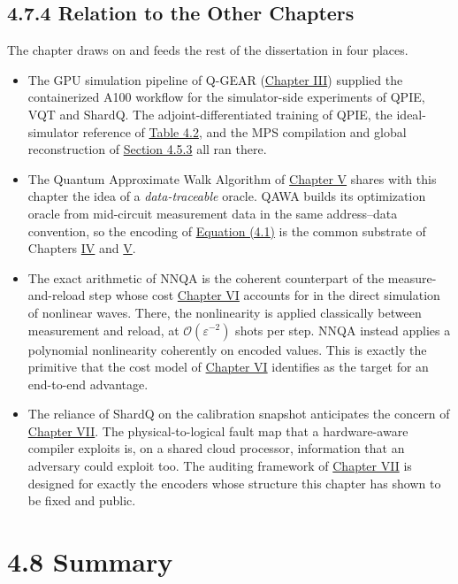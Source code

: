 \documentclass{report}
\theoremstyle{plain}
\theoremstyle{definition}
\theoremstyle{remark}
\newcommand{\bigO}[1]{\mathcal{O}\!\left(#1\right)}
\newcommand{\eps}{\varepsilon}
\begin{document}
\subsection{4.7.4 Relation to the Other Chapters}\label{sec:qml:synthesis:bridges}

The chapter draws on and feeds the rest of the dissertation in four places.
\begin{itemize}
\item The GPU simulation pipeline of Q-GEAR (\hyperref[ch:qgear]{Chapter III}) supplied the containerized A100 workflow for the simulator-side experiments of QPIE, VQT and ShardQ. The adjoint-differentiated training of QPIE, the ideal-simulator reference of \hyperref[tab:qml:vqt-hw]{Table 4.2}, and the MPS compilation and global reconstruction of \hyperref[sec:qml:shardq:mps]{Section 4.5.3} all ran there.
\item The Quantum Approximate Walk Algorithm of \hyperref[ch:nisq]{Chapter V} shares with this chapter the idea of a \emph{data-traceable} oracle. QAWA builds its optimization oracle from mid-circuit measurement data in the same address--data convention, so the encoding of \hyperref[eq:qml:qcrank]{Equation (4.1)} is the common substrate of Chapters \hyperref[ch:qml]{IV} and \hyperref[ch:nisq]{V}.
\item The exact arithmetic of NNQA is the coherent counterpart of the measure-and-reload step whose cost \hyperref[ch:synthesis]{Chapter VI} accounts for in the direct simulation of nonlinear waves. There, the nonlinearity is applied classically between measurement and reload, at $\bigO{\eps^{-2}}$ shots per step. NNQA instead applies a polynomial nonlinearity coherently on encoded values. This is exactly the primitive that the cost model of \hyperref[ch:synthesis]{Chapter VI} identifies as the target for an end-to-end advantage.
\item The reliance of ShardQ on the calibration snapshot anticipates the concern of \hyperref[ch:qec]{Chapter VII}. The physical-to-logical fault map that a hardware-aware compiler exploits is, on a shared cloud processor, information that an adversary could exploit too. The auditing framework of \hyperref[ch:qec]{Chapter VII} is designed for exactly the encoders whose structure this chapter has shown to be fixed and public.
\end{itemize}

\section{4.8 Summary}\label{sec:qml:summary}
\end{document}
